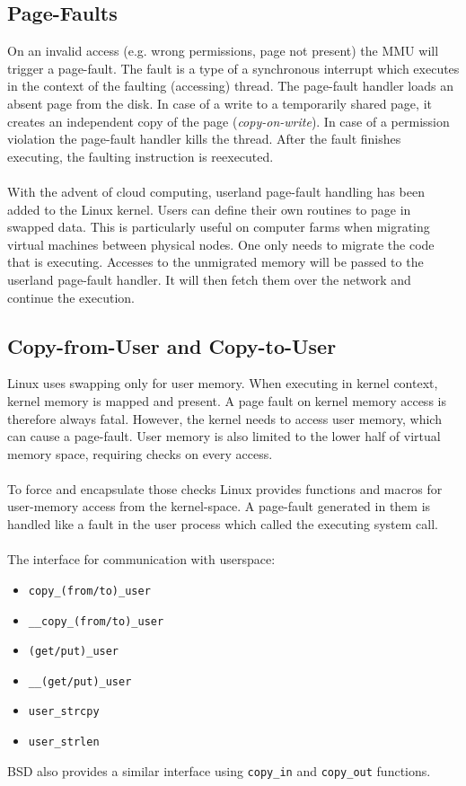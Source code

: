 \subsection{Page-Faults}
On an invalid access (e.g. wrong permissions, page not present) the MMU will trigger a page-fault. The fault is a type of a synchronous
interrupt which executes in the context of the faulting (accessing) thread. The page-fault handler loads an absent page from the disk.
In case of a write to a temporarily shared page, it creates an independent copy of the page (\emph{copy-on-write}). In case of a
permission violation the page-fault handler kills the thread. After the fault finishes executing, the faulting instruction is reexecuted. 
\\
\\
With the advent of cloud computing, userland page-fault handling has been added to the Linux kernel. Users can define their own routines
to page in swapped data. This is particularly useful on computer farms when migrating virtual machines between physical nodes. One only needs
to migrate the code that is executing. Accesses to the unmigrated memory will be passed to the userland page-fault handler. It will then
fetch them over the network and continue the execution.

\subsection{Copy-from-User and Copy-to-User}
Linux uses swapping only for user memory. When executing in kernel context, kernel memory is mapped and present. A page fault on kernel
memory access is therefore always fatal. However, the kernel needs to access user memory, which can cause a page-fault. User memory is
also limited to the lower half of virtual memory space, requiring checks on every access.
\\
\\
To force and encapsulate those checks Linux provides functions and macros for user-memory access from the kernel-space. A page-fault
generated in them is handled like a fault in the user process which called the executing system call.
\\
\\
The interface for communication with userspace:
\begin{itemize}
    \item[] \texttt{copy\_(from/to)\_user}
    \item[] \texttt{\_\_copy\_(from/to)\_user}
    \item[] \texttt{(get/put)\_user}
    \item[] \texttt{\_\_(get/put)\_user}
    \item[] \texttt{user\_strcpy}
    \item[] \texttt{user\_strlen}
\end{itemize}
\bigskip
BSD also provides a similar interface using \texttt{copy\_in} and \texttt{copy\_out} functions.

